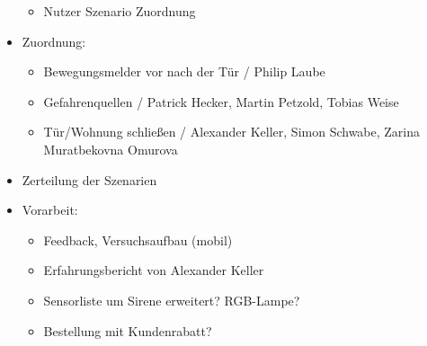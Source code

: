\begin{itemize}
\begin{itemize}
		\item Nutzer Szenario Zuordnung
	\end{itemize}
	\item Zuordnung:
	\begin{itemize}
		\item Bewegungsmelder vor nach der Tür / Philip Laube
		\item Gefahrenquellen / Patrick Hecker, Martin Petzold, Tobias Weise
		\item Tür/Wohnung schließen / Alexander Keller, Simon Schwabe, Zarina Muratbekovna Omurova
	\end{itemize}
	\item Zerteilung der Szenarien
	\item Vorarbeit:
	\begin{itemize}
		\item Feedback, Versuchsaufbau (mobil)
		\item Erfahrungsbericht von Alexander Keller
		\item Sensorliste um Sirene erweitert? RGB-Lampe?
		\item Bestellung mit Kundenrabatt?
	\end{itemize}
\end{itemize}


